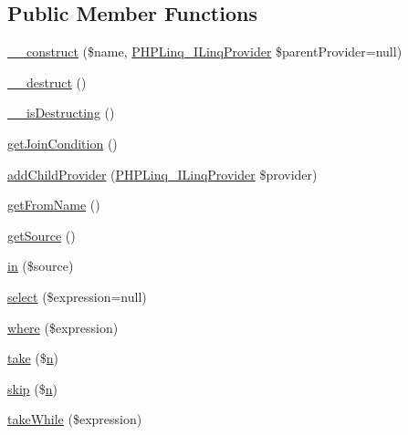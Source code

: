 \subsection*{\-Public \-Member \-Functions}
\begin{DoxyCompactItemize}
\item 
\hyperlink{class_p_h_p_linq___linq_to_objects_a928a5f42150b4e56d17aef568cfc5422}{\-\_\-\-\_\-construct} (\$name, \hyperlink{interface_p_h_p_linq___i_linq_provider}{\-P\-H\-P\-Linq\-\_\-\-I\-Linq\-Provider} \$parent\-Provider=null)
\item 
\hyperlink{class_p_h_p_linq___linq_to_objects_a421831a265621325e1fdd19aace0c758}{\-\_\-\-\_\-destruct} ()
\item 
\hyperlink{class_p_h_p_linq___linq_to_objects_a506479f6f7a079e71fbdeda02a1a6ab8}{\-\_\-\-\_\-is\-Destructing} ()
\item 
\hyperlink{class_p_h_p_linq___linq_to_objects_ad0ca423b939b19d85496cf514d1b5bb0}{get\-Join\-Condition} ()
\item 
\hyperlink{class_p_h_p_linq___linq_to_objects_a798e73787fcde65c17ad338b08f54fe7}{add\-Child\-Provider} (\hyperlink{interface_p_h_p_linq___i_linq_provider}{\-P\-H\-P\-Linq\-\_\-\-I\-Linq\-Provider} \$provider)
\item 
\hyperlink{class_p_h_p_linq___linq_to_objects_a3c49ca214406f4a6b62da5e775d6fb7a}{get\-From\-Name} ()
\item 
\hyperlink{class_p_h_p_linq___linq_to_objects_a42fdd8313c99d9c5f80219c1e192b93a}{get\-Source} ()
\item 
\hyperlink{class_p_h_p_linq___linq_to_objects_a91ece07609442e0e388f1115c21f2259}{in} (\$source)
\item 
\hyperlink{class_p_h_p_linq___linq_to_objects_ad65fd69a356c5d75610ef1c5c8f9e3b1}{select} (\$expression=null)
\item 
\hyperlink{class_p_h_p_linq___linq_to_objects_a59e1acf3496c614274a406aad5f59e99}{where} (\$expression)
\item 
\hyperlink{class_p_h_p_linq___linq_to_objects_a3962e38f48bc7bfd63ff01815e216ded}{take} (\$\hyperlink{add__cvs_8php_ab1b2829a7425bcec97d0ab4e6b3c77f2}{n})
\item 
\hyperlink{class_p_h_p_linq___linq_to_objects_af2536f10cfe7025b485561e1146e9cd0}{skip} (\$\hyperlink{add__cvs_8php_ab1b2829a7425bcec97d0ab4e6b3c77f2}{n})
\item 
\hyperlink{class_p_h_p_linq___linq_to_objects_a1fc5c97541d4b8666dbc7fb9ea3717a7}{take\-While} (\$expression)
\item 

\end{DoxyCompactItemize}
